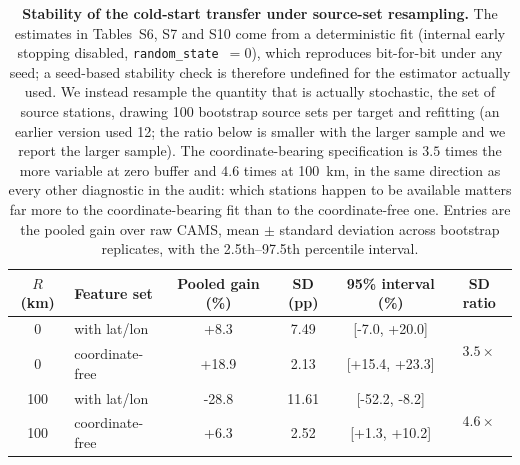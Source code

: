 \documentclass[11pt]{article}
\begin{document}
\begin{table}[htbp]\centering\footnotesize
\caption{\textbf{Stability of the cold-start transfer under source-set resampling.} The estimates in Tables~S6, S7 and S10 come from a deterministic fit (internal early stopping disabled, \texttt{random\_state}~$=0$), which reproduces bit-for-bit under any seed; a seed-based stability check is therefore undefined for the estimator actually used. We instead resample the quantity that is actually stochastic, the set of source stations, drawing 100 bootstrap source sets per target and refitting (an earlier version used 12; the ratio below is smaller with the larger sample and we report the larger sample). The coordinate-bearing specification is $3.5$ times the more variable at zero buffer and $4.6$ times at 100~km, in the same direction as every other diagnostic in the audit: which stations happen to be available matters far more to the coordinate-bearing fit than to the coordinate-free one. Entries are the pooled gain over raw CAMS, mean $\pm$ standard deviation across bootstrap replicates, with the 2.5th--97.5th percentile interval.}
\begin{tabular}{clcccc}\toprule
$R$ (km) & Feature set & Pooled gain (\%) & SD (pp) & 95\% interval (\%) & SD ratio \\ \midrule
0 & with lat/lon & +8.3 & 7.49 & [-7.0, +20.0] & \multirow{2}{*}{$3.5\times$} \\
0 & coordinate-free & +18.9 & 2.13 & [+15.4, +23.3] & \\
100 & with lat/lon & -28.8 & 11.61 & [-52.2, -8.2] & \multirow{2}{*}{$4.6\times$} \\
100 & coordinate-free & +6.3 & 2.52 & [+1.3, +10.2] & \\
\bottomrule\end{tabular}\end{table}
\end{document}
